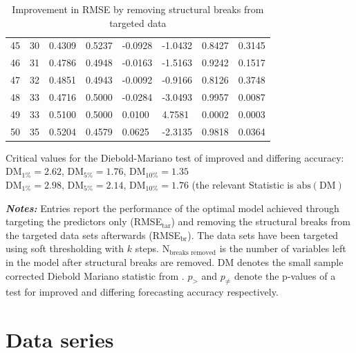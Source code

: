 \documentclass[12pt]{article}
\begin{document}
\begin{table}[htp]
\begin{tabular}{cc|lll|lll}
			45 & 30 & 0.4309 & 0.5237 & -0.0928 & -1.0432 & 0.8427 & 0.3145 \\
			46 & 31 & 0.4786 & 0.4948 & -0.0163 & -1.5163 & 0.9242 & 0.1517 \\
			47 & 32 & 0.4851 & 0.4943 & -0.0092 & -0.9166 & 0.8126 & 0.3748 \\
			48 & 33 & 0.4716 & 0.5000 & -0.0284 & -3.0493 & 0.9957 & 0.0087 \\ 
			49 & 33 & 0.5100 & 0.5000 & 0.0100 & 4.7581 & 0.0002 & 0.0003 \\
			50 & 35 & 0.5204 & 0.4579 & 0.0625 & -2.3135 & 0.9818 & 0.0364 \\ 
		\hline
	\end{tabular}
	\begin{minipage}{14cm}
		Critical values for the Diebold-Mariano test of improved and differing accuracy: \\ DM$_{1\%} = 2.62$, DM$_{5\%} = 1.76$, DM$_{10\%} = 1.35$ \\ DM$_{1\%} = 2.98$, DM$_{5\%} = 2.14$, DM$_{10\%} = 1.76$ (the relevant Statistic is $\text{abs}(\text{DM})$
	\end{minipage}
	\begin{minipage}{16cm}
		\small{\textbf{\textit{Notes:}} Entries report the performance of the optimal model achieved through targeting the predictors only (RMSE$_{\text{tar}}$) and removing the structural breaks from the targeted data sets afterwards (RMSE$_{\text{br}}$). The data sets have been targeted using soft thresholding with $k$ steps. N$_{\text{breaks removed}}$ is the number of variables left in the model after structural breaks are removed. DM denotes the small sample corrected Diebold Mariano statistic from \citet{harvey1997testing}. $p_>$ and $p_{\not =}$ denote the p-values of a test for improved and differing forecasting accuracy respectively.}
	\end{minipage}
	\caption{Improvement in RMSE by removing structural breaks from targeted data}
	\label{diff rmse by removing breaks after targeting}
\end{table}





\clearpage
\newpage

\section{Data series}
\label{Data series}
\end{document}
